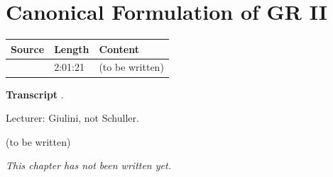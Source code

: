 \chapter{Canonical Formulation of GR II}\label{ch:c19}
\begin{paracol}{2}

\begin{sources}
\begin{tabularx}{\linewidth}{@{}l l L@{}}
\toprule
\textbf{Source} & \textbf{Length} & \textbf{Content}\\
\midrule
{} & 2:01:21 & (to be written)\\
\bottomrule
\end{tabularx}

\smallskip
\textbf{Transcript} .
\end{sources}

\begin{coursenote}[Lecturer]
Lecturer: Giulini, not Schuller.
\end{coursenote}

\begin{reading}
(to be written)
\end{reading}

\emph{This chapter has not been written yet.}

\flushside
\end{paracol}
